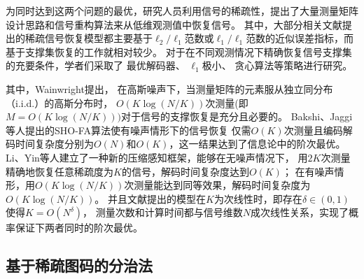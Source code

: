 \documentclass[AutoFakeBold]{LZUThesis}
\begin{document}
为同时达到这两个问题的最优，研究人员利用信号的稀疏性，提出了大量测量矩阵设计思路和信号重构算法来从低维观测值中恢复信号。
其中，大部分相关文献提出的稀疏信号恢复模型都主要基于$\ell_2 / \ell_1$范数或$\ell_1 / \ell_1$范数的近似误差指标，而基于支撑集恢复\cite{gilbert2010sparse}的工作就相对较少。
对于在不同观测情况下精确恢复信号支撑集的充要条件，学者们采取了
最优解码器\cite{861970, wainwright2007informationtheoretic}、
$\ell_1$极小\cite{10.1214/08-AOS653}、
贪心算法\cite{5895106}等策略进行研究。

其中，Wainwright\cite{wainwright2007informationtheoretic}提出，
在高斯噪声下，当测量矩阵的元素服从独立同分布（i.i.d.）的高斯分布时，
$O(K \log(N/K))$次测量(即$M = O(K \log(N/K)))$对于信号的支撑恢复是充分且必要的。
Bakshi、Jaggi\cite{7185441}等人提出的SHO-FA算法使有噪声情形下的信号恢复
仅需$O(K)$次测量且编码解码时间复杂度分别为$O(N)$和$O(K)$，这一结果达到了信息论中的阶次最优。
Li、Yin\cite{8733902}等人建立了一种新的压缩感知框架，能够在无噪声情况下，
用$2K$次测量精确地恢复任意稀疏度为$K$的信号，解码时间复杂度达到$O(K)$；
在有噪声情形，用$O(K \log(N/K))$次测量能达到同等效果，解码时间复杂度为$O(K \log(N/K))$。
并且文献\cite{8733902}提出的模型在$K$为次线性时，即存在$\delta \in (0,1)$使得$K = O(N^\delta)$，
测量次数和计算时间都与信号维数$N$成次线性关系，实现了概率保证下两者同时的阶次最优。

\subsection{基于稀疏图码的分治法}
\label{d_n_c}
\end{document}
